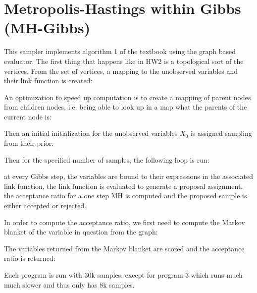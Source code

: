 \documentclass[]{article}
\begin{document}
\section{Metropolis-Hastings within Gibbs (MH-Gibbs)}
This sampler implements algorithm 1 of the textbook using the graph based evaluator. The first thing that happens like in HW2 is a topological sort of the vertices. From the set of vertices, a mapping to the unobserved variables and their link function is created:

An optimization to speed up computation is to create a mapping of parent nodes from children nodes, i.e. being able to look up in a map what the parents of the current node is:

Then an initial initialization for the unobserved variables $X_0$ is assigned sampling from their prior:

Then for the specified number of samples, the following loop is run:

at every Gibbs step, the variables are bound to their expressions in the associated link function, the link function is evaluated to generate a proposal assignment, the acceptance ratio for a one step MH is computed and the proposed sample is either accepted or rejected.
 
In order to compute the acceptance ratio, we first need to compute the Markov blanket of the variable in question from the graph:

The variables returned from the Markov blanket are scored and the acceptance ratio is returned:

Each program is run with 30k samples, except for program 3 which runs much much slower and thus only has 8k samples.
\end{document}
